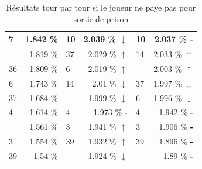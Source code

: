 \documentclass[letterpaper]{article}
\newcommand{\caseUp}[1][]{#1\textcolor[HTML]{008000}{$\mathbf{\uparrow}$}}
\newcommand{\caseStable}[1][]{#1\textcolor[HTML]{3779dd}{\textbf{-}}}
\newcommand{\caseDown}[1][]{#1\textcolor[HTML]{dd3737}{$\mathbf{\downarrow}$}}
\begin{document}
\begin{table}
\begin{tabular}{|l|r||l|r||l|r|}
	  \cellcolor[HTML]{1E90FF} 7 & 1.842 \% & \cellcolor[HTML]{1E90FF} 10 & 2.039 \% \caseDown[\hfill] & \cellcolor[HTML]{1E90FF} 10 & 2.037 \% \caseStable[\hfill] \\ \hline
	  \cellcolor[HTML]{8B1A1A} \textcolor{white}{5} & 1.819 \% & \cellcolor[HTML]{FFC1C1} 37 & 2.029 \% \caseUp[\hfill] & \cellcolor[HTML]{FF69B4} 14 & 2.033 \% \caseUp[\hfill] \\ \hline
	  \cellcolor[HTML]{E6E6FA} 36 & 1.809 \% & \cellcolor[HTML]{E6E6FA} 6 & 2.019 \% \caseUp[\hfill] & \cellcolor[HTML]{000000} \textcolor{white}{11} & 2.003 \% \caseUp[\hfill] \\ \hline
	  \cellcolor[HTML]{E6E6FA} 6 & 1.743 \% & \cellcolor[HTML]{FF69B4} 14 & 2.01 \% \caseDown[\hfill] & \cellcolor[HTML]{FFC1C1} 37 & 1.997 \% \caseDown[\hfill] \\ \hline
	  \cellcolor[HTML]{FFC1C1} 37 & 1.684 \% & \cellcolor[HTML]{000000} \textcolor{white}{11} & 1.999 \% \caseDown[\hfill] & \cellcolor[HTML]{E6E6FA} 6 & 1.996 \% \caseDown[\hfill] \\ \hline
	  \cellcolor[HTML]{A0522D} 4 & 1.614 \% & \cellcolor[HTML]{A0522D} 4 & 1.973 \% \caseStable[\hfill] & \cellcolor[HTML]{A0522D} 4 & 1.942 \% \caseStable[\hfill] \\ \hline
	  \cellcolor[HTML]{483D8B} \textcolor{white}{38} & 1.561 \% & \cellcolor[HTML]{EEEED1} 3 & 1.941 \% \caseUp[\hfill] & \cellcolor[HTML]{EEEED1} 3 & 1.906 \% \caseStable[\hfill] \\ \hline
	  \cellcolor[HTML]{EEEED1} 3 & 1.554 \% & \cellcolor[HTML]{8B1A1A} 39 & 1.932 \% \caseUp[\hfill] & \cellcolor[HTML]{8B1A1A} 39 & 1.896 \% \caseStable[\hfill] \\ \hline
	  \cellcolor[HTML]{8B1A1A} 39 & 1.54 \% & \cellcolor[HTML]{483D8B} \textcolor{white}{38} & 1.924 \% \caseDown[\hfill] & \cellcolor[HTML]{483D8B} \textcolor{white}{38} & 1.89 \% \caseStable[\hfill] \\ \hline
	\end{tabular}
	\caption{Résultats tour par tour si le joueur ne paye pas pour 
	sortir de prison}
	\label{result_tour_paye_pas}
      \end{table}
      
\end{document}
